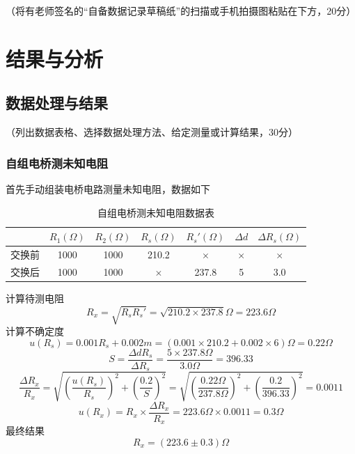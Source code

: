 \documentclass[10pt,a4paper]{ctexart}
\newcommand{\myspace}[1]{\par\vspace{#1\baselineskip}} %
\newcommand{\xiaosi}{\fontsize{12pt}{16pt}\selectfont}
\begin{document}
    \xiaosi （将有老师签名的“自备数据记录草稿纸”的扫描或手机拍摄图粘贴在下方，20分）
   

\section{结果与分析}

    \subsection{数据处理与结果}
    \xiaosi （列出数据表格、选择数据处理方法、给定测量或计算结果，30分）

    \subsubsection{自组电桥测未知电阻}
    首先手动组装电桥电路测量未知电阻，数据如下

    \begin{table}[H]
        \centering
        \begin{tabular}{|c|c|c|c|c|c|c|}
            \hline
            &$R_1(\Omega)$ & $R_2(\Omega)$ & $R_s(\Omega)$ & $R_s'(\Omega)$ & $\Delta d$ & $\Delta R_s(\Omega)$  \\
            \hline
            交换前 &1000 & 1000 & 210.2 & $\times$ & $\times$ & $\times$  \\
            \hline
            交换后 & 1000 & 1000 & $\times$ & 237.8 & 5 & 3.0 \\
            \hline
        \end{tabular}
        \caption{自组电桥测未知电阻数据表}
    \end{table}
    计算待测电阻
    \[R_x=\sqrt{R_s R_s'}=\sqrt{210.2 \times 237.8} \Omega =223.6 \Omega \]
    计算不确定度
\[u(R_s)=0.001 R_s + 0.002 m
=(0.001 \times 210.2  + 0.002 \times 6) \Omega 
= 0.22 \Omega
\]
\[
S=\frac{\Delta d R_s}{\Delta R_s}
=\frac{5 \times 237.8 \Omega}{3.0 \Omega}
=396.33
\]
\[
\frac{\Delta R_x}{R_x}=\sqrt{
\left( \frac{u(R_s)}{R_s} \right)^2
+ \left( \frac{0.2}{S} \right)^2
}
=\sqrt{
\left( \frac{0.22 \Omega}{237.8 \Omega} \right)^2
+ \left( \frac{0.2}{396.33} \right)^2
}
=0.0011
\]
\[
u(R_x)=R_x \times \frac{\Delta R_x}{R_x}
=223.6 \Omega \times 0.0011
=0.3 \Omega
\]
    最终结果
    \[R_x=(223.6 \pm 0.3) \Omega \]
    \myspace{2}
\end{document}
